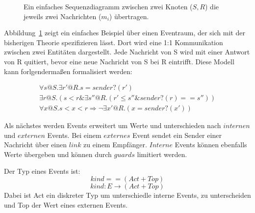 \begin{figure}
  \center
  \label{fig:sequence}
  \caption{Ein einfaches Sequenzdiagramm zwischen zwei Knoten ($S,R$) die jeweils
    zwei Nachrichten ($m_i$) übertragen.}
\end{figure}

Abbildung~\ref{fig:sequence} zeigt ein einfaches Beispiel über einen Eventraum,
der sich mit der bisherigen Theorie spezifizieren lässt. Dort wird eine 1:1
Kommunikation zwischen zwei Entitäten dargestellt. Jede Nachricht von S wird mit
einer Antwort von R quitiert, bevor eine neue Nachricht von S bei R eintrifft.
Diese Modell kann forlgendermaßen formalisiert werden:~\cite{bickford2005causal}

\begin{gather*}
  \forall s@S.\exists r'@R.s=sender?(r')\\
  \exists r@S.(s<r\&\exists s''@R.(r'\leq s''\& sender?(r) == s''))\\
  \forall x@S.s<x<r\Rightarrow \neg\exists x'@R.(x=sender?(x'))
\end{gather*}

Als nächstes werden Events erweitert um Werte und unterschieden nach
$internen$ und $externen$ Events. Bei einem $externes$ Event sendet ein Sender
einer Nachricht über einen $link$ zu einem Empfänger. $Interne$ Events können
ebenfalls Werte übergeben und können durch $guards$ limitiert werden.~\cite{bickford2005causal}

\begin{defi}
  Der Typ eines Events ist:
  \[
    kind == (Act+Top)
  \]
  \[
    kind: E\rightarrow (Act+Top)
  \]
  Dabei ist Act ein diskreter Typ um unterschiedle interne Events, zu
  unterscheiden und Top der Wert eines externen Events.
\end{defi}

